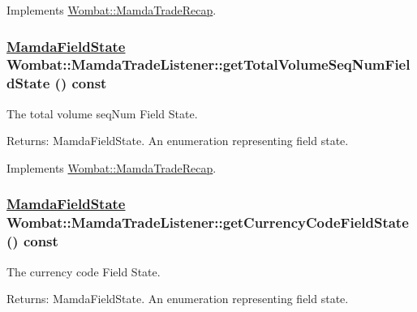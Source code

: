 Implements \hyperlink{classWombat_1_1MamdaTradeRecap_faa2d571451bc8a124a85a00e67f6fef}{Wombat::Mamda\-Trade\-Recap}.\hypertarget{classWombat_1_1MamdaTradeListener_399c33640428f8e7a5cd5e5eabc79ef8}{
\subsubsection[getTotalVolumeSeqNumFieldState]{\setlength{\rightskip}{0pt plus 5cm}\hyperlink{namespaceWombat_93aac974f2ab713554fd12a1fa3b7d2a}{Mamda\-Field\-State} Wombat::Mamda\-Trade\-Listener::get\-Total\-Volume\-Seq\-Num\-Field\-State () const}}
\label{classWombat_1_1MamdaTradeListener_399c33640428f8e7a5cd5e5eabc79ef8}


The total volume seq\-Num Field State. 

\begin{Desc}
\item[Returns:]Mamda\-Field\-State. An enumeration representing field state. \end{Desc}


Implements \hyperlink{classWombat_1_1MamdaTradeRecap_6a0c576b7c4902e34d3b144cc7120ec4}{Wombat::Mamda\-Trade\-Recap}.\hypertarget{classWombat_1_1MamdaTradeListener_775a85fc8f9a1c5ecb10e7576ca0165e}{
\subsubsection[getCurrencyCodeFieldState]{\setlength{\rightskip}{0pt plus 5cm}\hyperlink{namespaceWombat_93aac974f2ab713554fd12a1fa3b7d2a}{Mamda\-Field\-State} Wombat::Mamda\-Trade\-Listener::get\-Currency\-Code\-Field\-State () const}}
\label{classWombat_1_1MamdaTradeListener_775a85fc8f9a1c5ecb10e7576ca0165e}


The currency code Field State. 

\begin{Desc}
\item[Returns:]Mamda\-Field\-State. An enumeration representing field state. \end{Desc}


